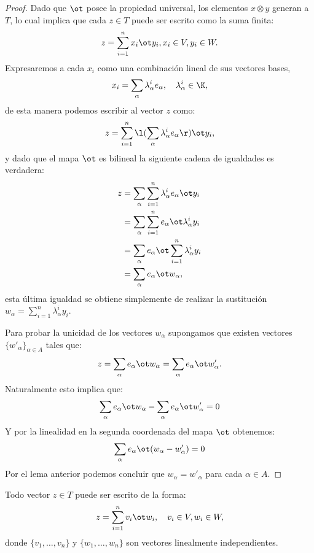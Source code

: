 \begin{proof}
	Dado que $\ot$ posee la propiedad universal, los elementos $x \otimes y$
	generan a $T$, lo cual implica que cada $z \in T$ puede ser escrito como la
	suma finita:
	\[
		z = \sum_{i=1}^{n} x_i \ot y_i, x_i \in V, y_i \in W.
	\]
	Expresaremos a cada $x_i$ como una combinación lineal de sus vectores bases,
	\[
		x_i = \sum_{\alpha}\lambda_{\alpha}^{i} e_\alpha,
		\quad
		\lambda_{\alpha}^{i} \in \K,
	\]
	de esta manera podemos escribir al vector $z$ como:
	\[
		z = \sum_{i=1}^{n}
		\l( \sum_{\alpha}\lambda_{\alpha}^{i} e_{\alpha} \r) \ot y_i,
	\]
	y dado que el mapa $\ot$ es bilineal la siguiente cadena de igualdades es
	verdadera:
	\begin{align*}
		z & = \sum_{\alpha}\sum_{i=1}^{n} \lambda_{\alpha}^{i} e_\alpha \ot y_i \\
		  & = \sum_{\alpha}\sum_{i=1}^{n} e_\alpha \ot \lambda_{\alpha}^{i} y_i \\
		  & = \sum_{\alpha} e_\alpha \ot \sum_{i=1}^{n}\lambda_{\alpha}^{i} y_i \\
		  & = \sum_{\alpha} e_\alpha \ot w_\alpha,
	\end{align*}
	esta última igualdad se obtiene simplemente de realizar la sustitución
	$w_\alpha = \sum_{i=1}^{n} \lambda_{\alpha}^{i} y_i$.

	Para probar la unicidad de los vectores $w_\alpha$ supongamos que existen
	vectores $\{w'_{\alpha}\}_{\alpha \in A}$ tales que:
	\[
		z = \sum_{\alpha} e_{\alpha} \ot w_\alpha
		= \sum_{\alpha} e_{\alpha} \ot w'_\alpha.
	\]
	Naturalmente esto implica que:
	\[
		\sum_{\alpha} e_{\alpha} \ot w_\alpha
		- \sum_{\alpha} e_{\alpha} \ot w'_\alpha = 0
	\]
	Y por la linealidad en la segunda coordenada del mapa $\ot$ obtenemos:
	\[
		\sum_{\alpha} e_{\alpha} \ot (w_{\alpha} - w'_{\alpha}) = 0
	\]
	Por el lema anterior podemos concluir que $w_{\alpha} = w'_{\alpha}$
	para cada $\alpha \in A$.
\end{proof}

\begin{lemma}
	Todo vector $z \in T$ puede ser escrito de la forma:
	\[
		z = \sum_{i=1}^{n} v_i \ot w_i, \quad v_i \in V, w_i \in W,
	\]
	donde $\{v_1,\ldots,v_n\}$ y $\{w_1,\ldots,w_n\}$ son vectores linealmente
	independientes.
\end{lemma}

